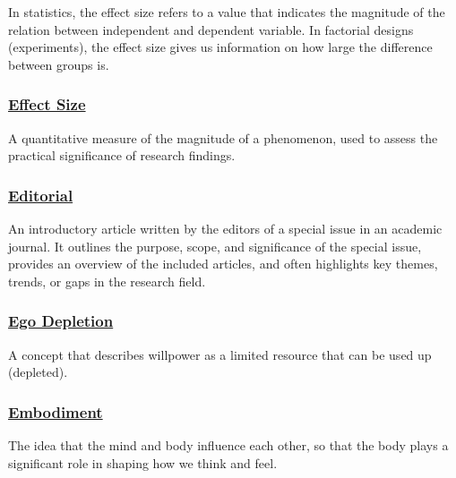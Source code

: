 \documentclass[
  letterpaper,
]{book}
\begin{document}
In statistics, the effect size refers to a value that indicates the
magnitude of the relation between independent and dependent variable. In
factorial designs (experiments), the effect size gives us information on
how large the difference between groups is.

\subsubsection*{\texorpdfstring{\hyperref[def-effectsize]{Effect
Size}}{Effect Size}}\label{effect-size-1}

A quantitative measure of the magnitude of a phenomenon, used to assess
the practical significance of research findings.

\subsubsection*{\texorpdfstring{\hyperref[def-editorial]{Editorial}}{Editorial}}\label{editorial}

An introductory article written by the editors of a special issue in an
academic journal. It outlines the purpose, scope, and significance of
the special issue, provides an overview of the included articles, and
often highlights key themes, trends, or gaps in the research field.

\subsubsection*{\texorpdfstring{\hyperref[def-egodepletion]{Ego
Depletion}}{Ego Depletion}}\label{ego-depletion-1}

A concept that describes willpower as a limited resource that can be
used up (depleted).

\subsubsection*{\texorpdfstring{\hyperref[def-embodiment]{Embodiment}}{Embodiment}}\label{embodiment}

The idea that the mind and body influence each other, so that the body
plays a significant role in shaping how we think and feel.
\end{document}
